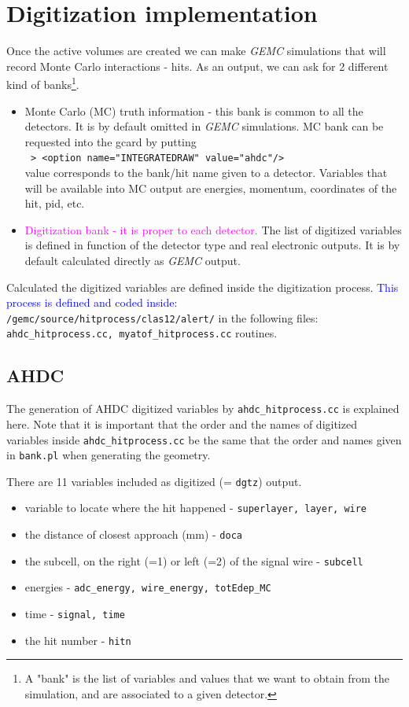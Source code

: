 \pagestyle{headings}
\chapter{Digitization implementation}
Once the active volumes are created we can make \textit{GEMC} simulations that will record Monte Carlo interactions - hits. As an output, we can ask for 2 different kind of banks\footnote{A "bank" is the list of variables and values that we want to obtain from the simulation, and are associated to a given detector.}.
\begin{itemize}
		\item Monte Carlo (MC) truth information - this bank is common to all the detectors. It is by default omitted in \textit{GEMC} simulations. MC bank can be requested into the gcard by putting \\
		\texttt{ > <option name="INTEGRATEDRAW" value="ahdc"/>} \\ value corresponds to the bank/hit name given to a detector. Variables that will be available into MC output are energies, momentum, coordinates of the hit, pid, etc.
		\item \textcolor{magenta}{Digitization bank - it is proper to each detector.} The list of digitized variables is defined in function of the detector type and real electronic outputs. It is by default calculated directly as \textit{GEMC} output. 
	\end{itemize}

Calculated the digitized variables are defined inside the digitization process. \textcolor{blue}{This process is defined and coded inside:} \\
\texttt{/gemc/source/hitprocess/clas12/alert/} in the following files: \\ \texttt{ahdc\_hitprocess.cc, myatof\_hitprocess.cc} routines.



\section{AHDC}
The generation of AHDC digitized variables by \texttt{ahdc\_hitprocess.cc} is explained here. Note that it is important that the order and the names of digitized variables inside \texttt{ahdc\_hitprocess.cc} be the same that the order and names given in  \texttt{bank.pl} when generating the geometry.

There are 11 variables included as digitized (= \texttt{dgtz}) output.
\begin{itemize}
	\item variable to locate where the hit happened - \texttt{superlayer, layer, wire}
	\item the distance of closest approach (mm) - \texttt{doca}
	\item the subcell, on the right (=1) or left (=2) of the signal wire - \texttt{subcell}
	\item energies - \texttt{adc\_energy, wire\_energy, totEdep\_MC}
	\item time - \texttt{signal, time}
	\item the hit number - \texttt{hitn}
\end{itemize}

